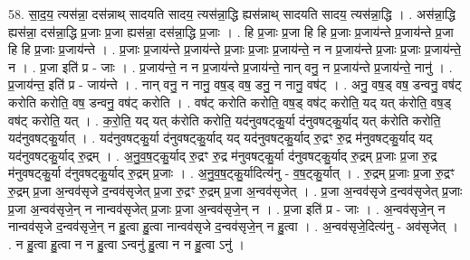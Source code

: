 \documentclass[17pt]{extarticle}
\begin{document}
58. सा॒द॒य॒ त्यस॑न्ना॒ दस॑न्नाथ् सादयति सादय॒ त्यस॑न्ना॒द्धि ह्यस॑न्नाथ् सादयति सादय॒ त्यस॑न्ना॒द्धि । . अस॑न्ना॒द्धि ह्यस॑न्ना॒ दस॑न्ना॒द्धि प्र॒जाः प्र॒जा ह्यस॑न्ना॒ दस॑न्ना॒द्धि प्र॒जाः । . हि प्र॒जाः प्र॒जा हि हि प्र॒जाः प्र॒जाय॑न्ते प्र॒जाय॑न्ते प्र॒जा हि हि प्र॒जाः प्र॒जाय॑न्ते । . प्र॒जाः प्र॒जाय॑न्ते प्र॒जाय॑न्ते प्र॒जाः प्र॒जाः प्र॒जाय॑न्ते॒ न न प्र॒जाय॑न्ते प्र॒जाः प्र॒जाः प्र॒जाय॑न्ते॒ न । . प्र॒जा इति॑ प्र - जाः । . प्र॒जाय॑न्ते॒ न न प्र॒जाय॑न्ते प्र॒जाय॑न्ते॒ नान् वनु॒ न प्र॒जाय॑न्ते प्र॒जाय॑न्ते॒ नानु॑ । . प्र॒जाय॑न्त॒ इति॑ प्र - जाय॑न्ते । . नान् वनु॒ न नानु॒ वष॒ड् वष॒ डनु॒ न नानु॒ वष॑ट् । . अनु॒ वष॒ड् वष॒ डन्वनु॒ वष॑ट् करोति करोति॒ वष॒ डन्वनु॒ वष॑ट् करोति । . वष॑ट् करोति करोति॒ वष॒ड् वष॑ट् करोति॒ यद् यत् क॑रोति॒ वष॒ड् वष॑ट् करोति॒ यत् । . क॒रो॒ति॒ यद् यत् क॑रोति करोति॒ यद॑नुवषट्कु॒र्या द॑नुवषट्कु॒र्याद् यत् क॑रोति करोति॒ यद॑नुवषट्कु॒र्यात् । . यद॑नुवषट्कु॒र्या द॑नुवषट्कु॒र्याद् यद् यद॑नुवषट्कु॒र्याद् रु॒द्रꣳ रु॒द्र म॑नुवषट्कु॒र्याद् यद् यद॑नुवषट्कु॒र्याद् रु॒द्रम् । . अ॒नु॒व॒ष॒ट्कु॒र्याद् रु॒द्रꣳ रु॒द्र म॑नुवषट्कु॒र्या द॑नुवषट्कु॒र्याद् रु॒द्रम् प्र॒जाः प्र॒जा रु॒द्र म॑नुवषट्कु॒र्या द॑नुवषट्कु॒र्याद् रु॒द्रम् प्र॒जाः । . अ॒नु॒व॒ष॒ट्कु॒र्यादित्य॑नु - व॒ष॒ट्कु॒र्यात् । . रु॒द्रम् प्र॒जाः प्र॒जा रु॒द्रꣳ रु॒द्रम् प्र॒जा अ॒न्वव॑सृजे द॒न्वव॑सृजेत् प्र॒जा रु॒द्रꣳ रु॒द्रम् प्र॒जा अ॒न्वव॑सृजेत् । . प्र॒जा अ॒न्वव॑सृजे द॒न्वव॑सृजेत् प्र॒जाः प्र॒जा अ॒न्वव॑सृजे॒न् न नान्वव॑सृजेत् प्र॒जाः प्र॒जा अ॒न्वव॑सृजे॒न् न । . प्र॒जा इति॑ प्र - जाः । . अ॒न्वव॑सृजे॒न् न नान्वव॑सृजे द॒न्वव॑सृजे॒न् न हु॒त्वा हु॒त्वा नान्वव॑सृजे द॒न्वव॑सृजे॒न् न हु॒त्वा । . अ॒न्वव॑सृजे॒दित्य॑नु - अव॑सृजेत् । . न हु॒त्वा हु॒त्वा न न हु॒त्वा ऽन्वनु॑ हु॒त्वा न न हु॒त्वा ऽनु॑ । \newline
\end{document}
